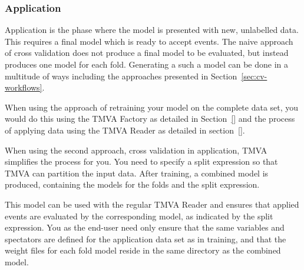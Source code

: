 










\subsubsection{Application}
\label{sec:cv-application}

Application is the phase where the model is presented with new, unlabelled data. This requires a final model which is ready to accept events. The naive approach of cross validation does not produce a final model to be evaluated, but instead produces one model for each fold. Generating a such a model can be done in a multitude of ways including the approaches presented in Section~\ref{sec:cv-workflows}.

When using the approach of retraining your model on the complete data set, you would do this using the TMVA Factory as detailed in Section~\ref{} and the process of applying data using the TMVA Reader as detailed in section~\ref{}.

When using the second approach, cross validation in application, TMVA simplifies the process for you. You need to specify a split expression so that TMVA can partition the input data. After training, a combined model is produced, containing the models for the folds and the split expression.

This model can be used with the regular TMVA Reader and ensures that applied events are evaluated by the corresponding model, as indicated by the split expression. You as the end-user need only ensure that the same variables and spectators are defined for the application data set as in training, and that the weight files for each fold model reside in the same directory as the combined model.

